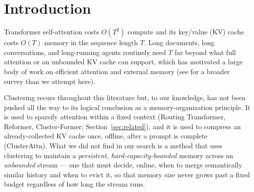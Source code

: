 \documentclass[11pt]{article}
\begin{document}
\begin{abstract}
thereby ruled out by direct measurement rather than by assumption, across three independently
reasoned rounds of experiments. We report this full self-correcting process and contribute the
synthesized method, the tested implementation, and the exclusion chain itself as this paper's
result: the remaining untested hypothesis --- that the memory cross-attention's own
content-matching circuit needs substantially more training than we gave it to bootstrap at all
--- is a question about training dynamics rather than about clustering versus raw retention, and
we treat stopping here, with three specific explanations ruled out rather than an unexplained
null, as a deliberate conclusion rather than an unfinished lead.
\end{abstract}

\section{Introduction}

Transformer self-attention costs $O(T^2)$ compute and its key/value (KV) cache costs $O(T)$
memory in the sequence length $T$. Long documents, long conversations, and long-running agents
routinely need $T$ far beyond what full attention or an unbounded KV cache can support, which has
motivated a large body of work on efficient attention and external memory (see
\citet{survey2025} for a broader survey than we attempt here).

Clustering recurs throughout this literature but, to our knowledge, has not been pushed all the
way to its logical conclusion as a memory-organization principle. It is used to sparsify
attention within a fixed context (Routing Transformer, Reformer, Cluster-Former;
Section~\ref{sec:related}), and it is used to compress an already-collected KV cache once, offline,
after a prompt is complete (ClusterAttn). What we did not find in our search is a method that
uses clustering to maintain a \emph{persistent, hard-capacity-bounded} memory across an
\emph{unbounded} stream --- one that must decide, online, when to merge semantically similar
history and when to evict it, so that memory size never grows past a fixed budget regardless of
how long the stream runs.
\end{document}
